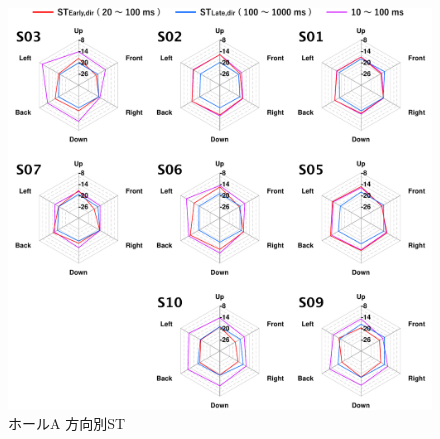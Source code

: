 \documentclass[11pt,a4j]{jreport}
\begin{document}
  \begin{figure}[H]
    \centering
    \includegraphics[scale=.75]{images/realHallDirSt/allPoint/reshaped/a.pdf}
    \caption*{ホールA 方向別ST}
  \end{figure}

  \newpage
\end{document}
